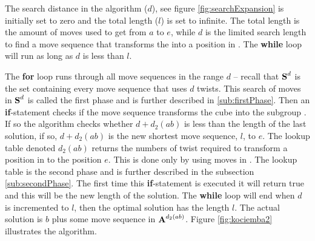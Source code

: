 The search distance in the algorithm ($d$), see figure \ref{fig:searchExpansion} is initially set to zero and the total length ($l$) is set to infinite. The total length is the amount of moves used to get from $a$ to $e$, while $d$ is the limited search length to find a move sequence that transforms the \rubik{} into a position in . 
The \textbf{while} loop will run as long as $d$ is less than $l$.

The \textbf{for} loop runs through all move sequences in the range $d$ -- recall that $\textbf{S}^d$ is the set containing every move sequence that uses $d$ twists. This search of moves in $\textbf{S}^d$ is called the first phase and is further described in \ref{sub:firstPhase}.
Then an \textbf{if}-statement checks if the move sequence transforms the cube into the subgroup . If so the algorithm checks whether $d + d_2(ab)$ is less than the length of the last solution, if so, $d + d_2(ab)$ is the new shortest move sequence, $l$, to $e$. 
The lookup table denoted $d_2(ab)$ returns the numbers of twist required to transform a position in  to the position $e$. This is done only by using moves in . %
The lookup table is the second phase and is further described in the subsection \ref{sub:secondPhase}. 
The first time this \textbf{if}-statement is executed it will return true and this will be the new length of the solution. The \textbf{while} loop will end when $d$ is incremented to $l$, then the optimal solution has the length $l$. The actual solution is $b$ plus some move sequence in $\textbf{A}^{d_{2}(ab)}$. Figure \ref{fig:kociemba2} illustrates the algorithm.
